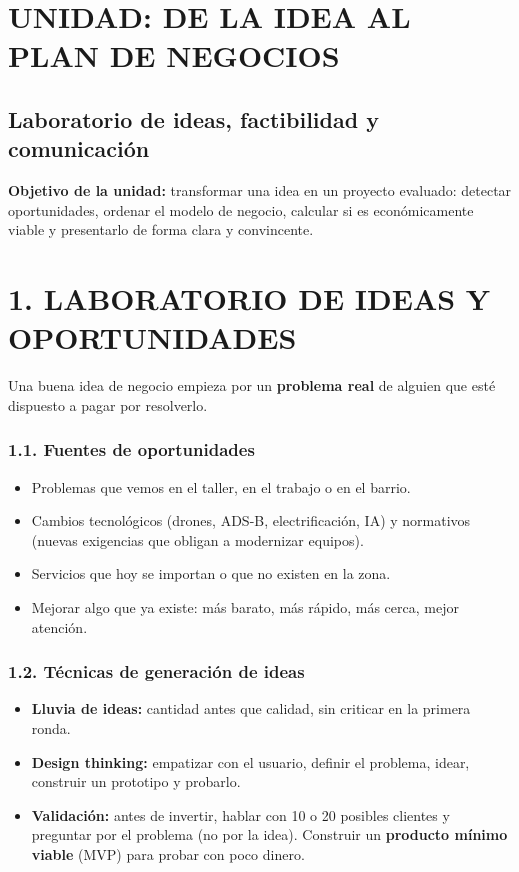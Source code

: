 \clearpage
\section*{UNIDAD: DE LA IDEA AL PLAN DE NEGOCIOS}
\subsection*{Laboratorio de ideas, factibilidad y comunicación}

\begin{recuadro}
\textbf{Objetivo de la unidad:} transformar una idea en un proyecto evaluado: detectar
oportunidades, ordenar el modelo de negocio, calcular si es económicamente viable y
presentarlo de forma clara y convincente.
\end{recuadro}

\section*{1. LABORATORIO DE IDEAS Y OPORTUNIDADES}

Una buena idea de negocio empieza por un \textbf{problema real} de alguien que esté dispuesto
a pagar por resolverlo.

\subsubsection*{1.1. Fuentes de oportunidades}
\begin{itemize}
  \item Problemas que vemos en el taller, en el trabajo o en el barrio.
  \item Cambios tecnológicos (drones, ADS-B, electrificación, IA) y normativos (nuevas
        exigencias que obligan a modernizar equipos).
  \item Servicios que hoy se importan o que no existen en la zona.
  \item Mejorar algo que ya existe: más barato, más rápido, más cerca, mejor atención.
\end{itemize}

\subsubsection*{1.2. Técnicas de generación de ideas}
\begin{itemize}
  \item \textbf{Lluvia de ideas:} cantidad antes que calidad, sin criticar en la primera ronda.
  \item \textbf{Design thinking:} empatizar con el usuario, definir el problema, idear,
        construir un prototipo y probarlo.
  \item \textbf{Validación:} antes de invertir, hablar con 10 o 20 posibles clientes y
        preguntar por el problema (no por la idea). Construir un \textbf{producto mínimo
        viable} (MVP) para probar con poco dinero.
\end{itemize}

